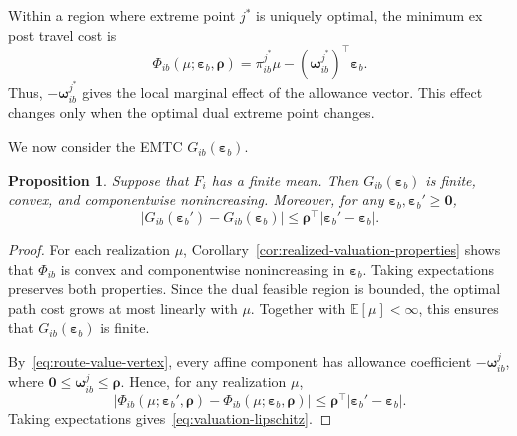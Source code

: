 \documentclass{article}
\newtheorem{proposition}{Proposition}
\begin{document}
Within a region where extreme point $j^*$ is uniquely optimal, the minimum
ex post travel cost is
\begin{equation}
    \Phi_{ib}(\mu;\bm\varepsilon_b,\bm\rho)
    =
    \pi_{ib}^{j^*}\mu
    -
    (\bm\omega_{ib}^{j^*})^{\top}\bm\varepsilon_b.
    \label{eq:route-value-local-affine}
\end{equation}
Thus, $-\bm\omega_{ib}^{j^*}$ gives the local marginal effect of the
allowance vector. This effect changes only when the optimal dual
extreme point changes.

We now consider the EMTC
$G_{ib}(\bm\varepsilon_b)$.

\begin{proposition}
Suppose that $F_i$ has a finite mean. Then
$G_{ib}(\bm\varepsilon_b)$ is finite, convex, and componentwise
nonincreasing. Moreover, for any
$\bm\varepsilon_b,\bm\varepsilon_b'\geq\bm0$,
\begin{equation}
    \left|
        G_{ib}(\bm\varepsilon_b')
        -
        G_{ib}(\bm\varepsilon_b)
    \right|
    \leq
    \bm\rho^{\top}
    \left|
        \bm\varepsilon_b'
        -
        \bm\varepsilon_b
    \right|.
    \label{eq:valuation-lipschitz}
\end{equation}
\label{prop:expected-valuation-properties}
\end{proposition}

\begin{proof}
For each realization $\mu$,
Corollary~\ref{cor:realized-valuation-properties} shows that
$\Phi_{ib}$ is convex and componentwise nonincreasing in
$\bm\varepsilon_b$. Taking expectations preserves both properties.
Since the dual feasible region is bounded, the optimal path cost grows
at most linearly with $\mu$. Together with $\mathbb E[\mu]<\infty$,
this ensures that $G_{ib}(\bm\varepsilon_b)$ is finite.

By~\eqref{eq:route-value-vertex}, every affine component has allowance
coefficient $-\bm\omega_{ib}^j$, where
$\bm0\leq\bm\omega_{ib}^j\leq\bm\rho$. Hence, for any realization
$\mu$,
\begin{equation}
    \left|
        \Phi_{ib}(\mu;\bm\varepsilon_b',\bm\rho)
        -
        \Phi_{ib}(\mu;\bm\varepsilon_b,\bm\rho)
    \right|
    \leq
    \bm\rho^{\top}
    \left|
        \bm\varepsilon_b'
        -
        \bm\varepsilon_b
    \right|.
\end{equation}
Taking expectations gives~\eqref{eq:valuation-lipschitz}.
\end{proof}
\end{document}
